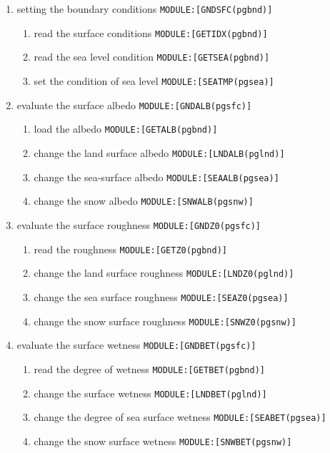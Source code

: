 \begin{enumerate}
\def\labelenumi{\arabic{enumi}.}
\item
  setting the boundary conditions \texttt{MODULE:{[}GNDSFC(pgbnd){]}}

  \begin{enumerate}
  \def\labelenumii{\arabic{enumii}.}
  \item
    read the surface conditions \texttt{MODULE:{[}GETIDX(pgbnd){]}}
  \item
    read the sea level condition \texttt{MODULE:{[}GETSEA(pgbnd){]}}
  \item
    set the condition of sea level \texttt{MODULE:{[}SEATMP(pgsea){]}}
  \end{enumerate}
\item
  evaluate the surface albedo \texttt{MODULE:{[}GNDALB(pgsfc){]}}

  \begin{enumerate}
  \def\labelenumii{\arabic{enumii}.}
  \item
    load the albedo \texttt{MODULE:{[}GETALB(pgbnd){]}}
  \item
    change the land surface albedo \texttt{MODULE:{[}LNDALB(pglnd){]}}
  \item
    change the sea-surface albedo \texttt{MODULE:{[}SEAALB(pgsea){]}}
  \item
    change the snow albedo \texttt{MODULE:{[}SNWALB(pgsnw){]}}
  \end{enumerate}
\item
  evaluate the surface roughness \texttt{MODULE:{[}GNDZ0(pgsfc){]}}

  \begin{enumerate}
  \def\labelenumii{\arabic{enumii}.}
  \item
    read the roughness \texttt{MODULE:{[}GETZ0(pgbnd){]}}
  \item
    change the land surface roughness \texttt{MODULE:{[}LNDZ0(pglnd){]}}
  \item
    change the sea surface roughness \texttt{MODULE:{[}SEAZ0(pgsea){]}}
  \item
    change the snow surface roughness \texttt{MODULE:{[}SNWZ0(pgsnw){]}}
  \end{enumerate}
\item
  evaluate the surface wetness \texttt{MODULE:{[}GNDBET(pgsfc){]}}

  \begin{enumerate}
  \def\labelenumii{\arabic{enumii}.}
  \item
    read the degree of wetness \texttt{MODULE:{[}GETBET(pgbnd){]}}
  \item
    change the surface wetness \texttt{MODULE:{[}LNDBET(pglnd){]}}
  \item
    change the degree of sea surface wetness
    \texttt{MODULE:{[}SEABET(pgsea){]}}
  \item
    change the snow surface wetness \texttt{MODULE:{[}SNWBET(pgsnw){]}}
  \end{enumerate}
\end{enumerate}

